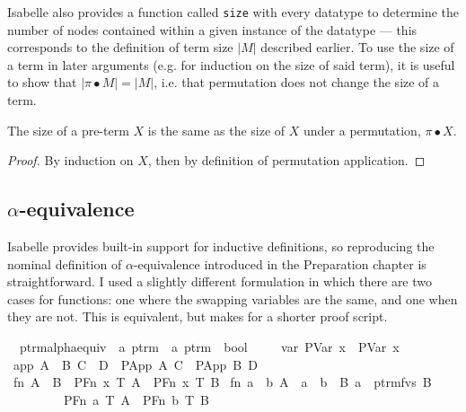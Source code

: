 Isabelle also provides a function called \texttt{size} with every datatype to determine the number of nodes contained within a given instance of the datatype --- this corresponds to the definition of term size \(|M|\) described earlier.
To use the size of a term in later arguments (e.g. for induction on the size of said term), it is useful to show that \(|\pi \bullet M| = |M|\), i.e. that permutation does not change the size of a term.

\begin{lemma}
The size of a pre-term \(X\) is the same as the size of \(X\) under a permutation, \(\pi \bullet X\).
\end{lemma}
\begin{proof}
By induction on \(X\), then by definition of permutation application.
\end{proof}

\subsection{\(\alpha\)-equivalence}
Isabelle provides built-in support for inductive definitions, so reproducing the nominal definition of \(\alpha\)-equivalence introduced in the Preparation chapter is straightforward.
I used a slightly different formulation in which there are two cases for functions: one where the swapping variables are the same, and one when they are not.
This is equivalent, but makes for a shorter proof script.

\begin{implementation}
\isamarkupfalse%
\isanewline
\ \ ptrm{\isacharunderscore}alpha{\isacharunderscore}equiv\ {\isacharcolon}{\isacharcolon}\ {\isachardoublequoteopen}{\isacharprime}a\ ptrm\ {\isasymRightarrow}\ {\isacharprime}a\ ptrm\ {\isasymRightarrow}\ bool{\isachardoublequoteclose}\isanewline
\ \ \isanewline
\ \ var{\isacharcolon}\ {\isachardoublequoteopen}{\isacharparenleft}PVar\ x{\isacharparenright}\ {\isasymapprox}\ {\isacharparenleft}PVar\ x{\isacharparenright}{\isachardoublequoteclose}\isanewline
{\isacharbar}\ app{\isacharcolon}\ {\isachardoublequoteopen}{\isasymlbrakk}A\ {\isasymapprox}\ B{\isacharsemicolon}\ C\ {\isasymapprox}\ D{\isasymrbrakk}\ {\isasymLongrightarrow}\ {\isacharparenleft}PApp\ A\ C{\isacharparenright}\ {\isasymapprox}\ {\isacharparenleft}PApp\ B\ D{\isacharparenright}{\isachardoublequoteclose}\isanewline
{\isacharbar}\ fn{}{\isacharcolon}\ {\isachardoublequoteopen}A\ {\isasymapprox}\ B\ {\isasymLongrightarrow}\ {\isacharparenleft}PFn\ x\ T\ A{\isacharparenright}\ {\isasymapprox}\ {\isacharparenleft}PFn\ x\ T\ B{\isacharparenright}{\isachardoublequoteclose}\isanewline
{\isacharbar}\ fn{}{\isacharcolon}\ {\isachardoublequoteopen}{\isasymlbrakk}a\ {\isasymnoteq}\ b{\isacharsemicolon}\ A\ {\isasymapprox}\ {\isacharbrackleft}a\ {\isasymleftrightarrow}\ b{\isacharbrackright}\ {\isasymbullet}\ B{\isacharsemicolon}\ a\ {\isasymnotin}\ ptrm{\isacharunderscore}fvs\ B{\isasymrbrakk}\isanewline
\ \ \ \ \ \ \ \ {\isasymLongrightarrow}\ {\isacharparenleft}PFn\ a\ T\ A{\isacharparenright}\ {\isasymapprox}\ {\isacharparenleft}PFn\ b\ T\ B{\isacharparenright}{\isachardoublequoteclose}\isanewline
\end{implementation}

